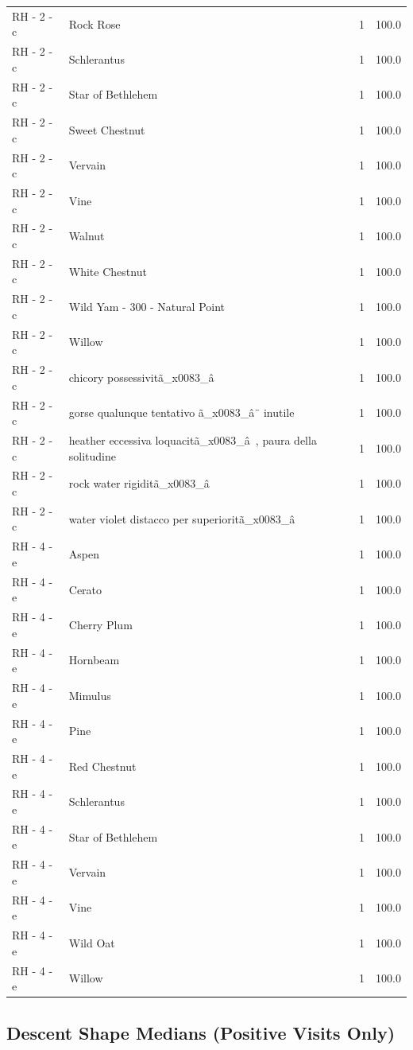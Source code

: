 \documentclass[a4paper,11pt]{article}
\begin{document}
\begin{footnotesize}
\begin{longtable}{p{3.5cm}p{7.5cm}rr}
RH - 2 - c & Rock Rose & 1 & 100.0 \\
RH - 2 - c & Schlerantus & 1 & 100.0 \\
RH - 2 - c & Star of Bethlehem & 1 & 100.0 \\
RH - 2 - c & Sweet Chestnut & 1 & 100.0 \\
RH - 2 - c & Vervain & 1 & 100.0 \\
RH - 2 - c & Vine & 1 & 100.0 \\
RH - 2 - c & Walnut & 1 & 100.0 \\
RH - 2 - c & White Chestnut & 1 & 100.0 \\
RH - 2 - c & Wild Yam - 300  - Natural Point & 1 & 100.0 \\
RH - 2 - c & Willow & 1 & 100.0 \\
RH - 2 - c & chicory possessivitã\_x0083\_â & 1 & 100.0 \\
RH - 2 - c & gorse qualunque tentativo ã\_x0083\_â¨ inutile & 1 & 100.0 \\
RH - 2 - c & heather eccessiva loquacitã\_x0083\_â , paura della solitudine & 1 & 100.0 \\
RH - 2 - c & rock water rigiditã\_x0083\_â & 1 & 100.0 \\
RH - 2 - c & water violet distacco per superioritã\_x0083\_â & 1 & 100.0 \\
RH - 4 - e & Aspen & 1 & 100.0 \\
RH - 4 - e & Cerato & 1 & 100.0 \\
RH - 4 - e & Cherry Plum & 1 & 100.0 \\
RH - 4 - e & Hornbeam & 1 & 100.0 \\
RH - 4 - e & Mimulus & 1 & 100.0 \\
RH - 4 - e & Pine & 1 & 100.0 \\
RH - 4 - e & Red Chestnut & 1 & 100.0 \\
RH - 4 - e & Schlerantus & 1 & 100.0 \\
RH - 4 - e & Star of Bethlehem & 1 & 100.0 \\
RH - 4 - e & Vervain & 1 & 100.0 \\
RH - 4 - e & Vine & 1 & 100.0 \\
RH - 4 - e & Wild Oat & 1 & 100.0 \\
RH - 4 - e & Willow & 1 & 100.0 \\
\end{longtable}
\end{footnotesize}

\subsection{Descent Shape Medians (Positive Visits Only)}
\end{document}
